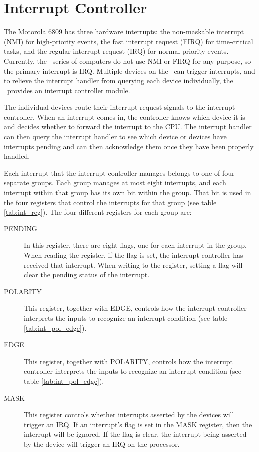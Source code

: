 \chapter{Interrupt Controller}
\label{chap:interrupts}

The Motorola 6809 has three hardware interrupts: the non-maskable interrupt (NMI) for high-priority events, the fast interrupt request (FIRQ) for time-critical tasks, and the regular interrupt request (IRQ) for normal-priority events. Currently, the \jr\ series of computers do not use NMI or FIRQ for any purpose, so the primary interrupt is IRQ. Multiple devices on the \jr\ can trigger interrupts, and to relieve the interrupt handler from querying each device individually, the \jr\ provides an interrupt controller module.

The individual devices route their interrupt request signals to the interrupt controller. When an interrupt comes in, the controller knows which device it is and decides whether to forward the interrupt to the CPU. The interrupt handler can then query the interrupt handler to see which device or devices have interrupts pending and can then acknowledge them once they have been properly handled.

Each interrupt that the interrupt controller manages belongs to one of four separate groups. Each group manages at most eight interrupts, and each interrupt within that group has its own bit within the group. That bit is used in the four registers that control the interrupts for that group (see table \ref{tab:int_reg}). The four different registers for each group are:

\begin{description}
    \item[PENDING] In this register, there are eight flags, one for each interrupt in the group. When reading the register, if the flag is set, the interrupt controller has received that interrupt. When writing to the register, setting a flag will clear the pending status of the interrupt.
    \item[POLARITY] This register, together with EDGE, controls how the interrupt controller interprets the inputs to recognize an interrupt condition (see table \ref{tab:int_pol_edge}).
    \item[EDGE] This register, together with POLARITY, controls how the interrupt controller interprets the inputs to recognize an interrupt condition (see table \ref{tab:int_pol_edge}).
    \item[MASK] This register controls whether interrupts asserted by the devices will trigger an IRQ. If an interrupt's flag is set in the MASK register, then the interrupt will be ignored. If the flag is clear, the interrupt being asserted by the device will trigger an IRQ on the processor.
\end{description}

